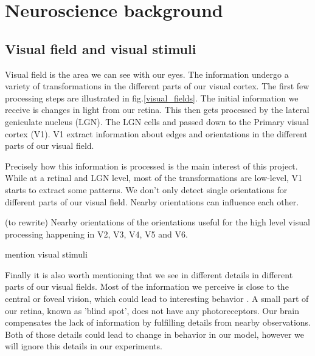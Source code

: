 \section{Neuroscience background}
\subsection{Visual field and visual stimuli}

Visual field is the area we can see with our eyes. The information undergo a variety of transformations in the different parts of our visual cortex. The first few processing steps are illustrated in fig.\ref{visual_fields}. The initial information we receive is changes in light from our retina. This then gets processed by the lateral geniculate nucleus (LGN). The LGN cells  and passed down to the Primary visual cortex (V1). V1 extract information about edges and orientations in the different parts of our visual field. 


Precisely how this information is processed is the main interest of this project. While at a retinal and LGN level, most of the transformations are low-level, V1 starts to extract some patterns. We don't only detect single orientations for different parts of our visual field. Nearby orientations can influence each other. 

(to rewrite)
Nearby orientations of the orientations useful for the high level visual processing happening in V2, V3, V4, V5 and V6. 

mention visual stimuli

Finally it is also worth mentioning that we see in different details in different parts of our visual fields. Most of the information we perceive is close to the central or foveal vision, which could lead to interesting behavior \cite{knight2008drastically}. A small part of our retina, known as 'blind spot', does not have any photoreceptors. Our brain compensates the lack of information by fulfilling details from nearby observations. Both of those details could lead to change in behavior in our model, however we will ignore this details in our experiments.


